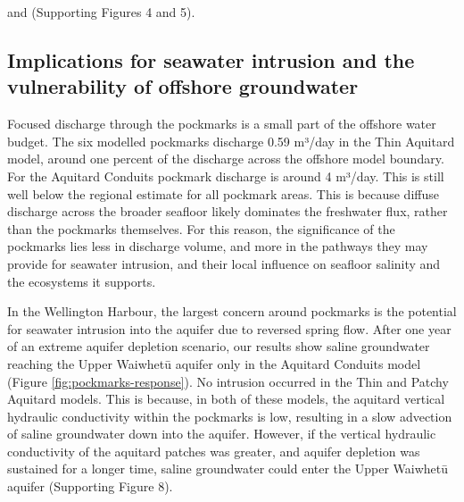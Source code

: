 \documentclass[draft, 10pt]{agujournal2019}
\begin{document}
  and  (Supporting Figures 4 and 5). 


\subsection{Implications for seawater intrusion and the vulnerability of offshore groundwater}

Focused discharge through the pockmarks is a small part of the offshore water budget.
The six modelled pockmarks discharge 0.59 m³/day in the Thin Aquitard model, around one percent of the discharge across the offshore model boundary.
For the Aquitard Conduits pockmark discharge is around 4 m³/day.
This is still well below the regional estimate for all pockmark areas.
This is because diffuse discharge across the broader seafloor likely dominates the freshwater flux, rather than the pockmarks themselves.
For this reason, the significance of the pockmarks lies less in discharge volume, and more in the pathways they may provide for seawater intrusion, and their local influence on seafloor salinity and the ecosystems it supports.

In the Wellington Harbour, the largest concern around pockmarks is the potential for seawater intrusion into the aquifer due to reversed spring flow.
After one year of an extreme aquifer depletion scenario, our results show saline groundwater reaching the Upper Waiwhetū aquifer only in the Aquitard Conduits model (Figure \ref{fig:pockmarks-response}). No intrusion occurred in the Thin and Patchy Aquitard models.
This is because, in both of these models, the aquitard vertical hydraulic conductivity within the pockmarks is low, resulting in a slow advection of saline groundwater down into the aquifer.
However, if the vertical hydraulic conductivity of the aquitard patches was greater, and aquifer depletion was sustained for a longer time, saline groundwater could enter the Upper Waiwhetū aquifer (Supporting Figure 8).
\end{document}
